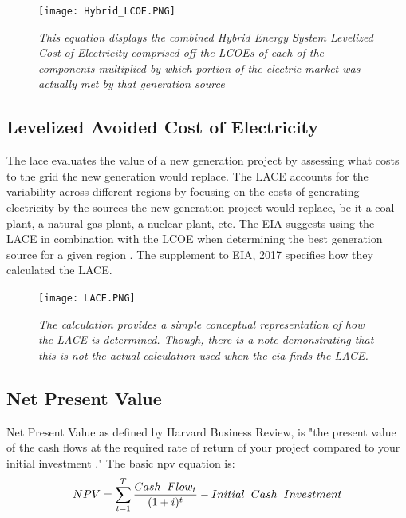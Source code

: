 \documentclass[12pt]{UIdahoMastersThesis}
\begin{document}
\begin{figure}[h!]
\texttt{[image: Hybrid\_LCOE.PNG]}
\caption{\small \sl This equation displays the combined Hybrid Energy System Levelized Cost of Electricity comprised off the LCOEs of each of the components multiplied by which portion of the electric market was actually met by that generation source \cite{Baker2016} }
\end{figure}


\subsection{Levelized Avoided Cost of Electricity}
The \ac{lace} evaluates the value of a new generation project by assessing what costs to the grid the new generation would replace. The LACE accounts for the variability across different regions by focusing on the costs of generating electricity by the sources the new generation project would replace, be it a coal plant, a natural gas plant, a nuclear plant, etc.  The EIA suggests using the LACE in combination with the LCOE when determining the best generation source for a given region \cite{Eia2017}. The supplement to EIA, 2017 specifies how they calculated the LACE.


\begin{figure}[h!]
\texttt{[image: LACE.PNG]}
\caption{\small \sl The calculation provides a simple conceptual representation of how the LACE is determined. Though, there is a note demonstrating that this is not the actual calculation used when the \ac{eia} finds the LACE. \cite{Namovicz2013} }
\end{figure}



\subsection{Net Present Value}
Net Present Value as defined by Harvard Business Review, is "the present value of the cash flows at the required rate of return of your project compared to your initial investment \cite{Gallo}." The basic \ac{npv} equation is:
\begin{equation*}
NPV=\sum_{t=1}^T\frac{Cash\hspace{.2 cm}Flow_t}{(1+i)^t}-Initial\hspace{.2 cm}Cash\hspace{.2 cm}Investment
\end{equation*}
\end{document}
